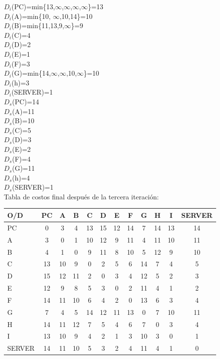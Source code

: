 \documentclass{article}
\begin{document}
{{{$D_i$(PC)=min\{13,$\infty$,$\infty$,$\infty$,$\infty$\}=13\\
$D_i$(A)=min\{10, $\infty$,10,14\}=10\\
$D_i$(B)=min\{11,13,9,$\infty$\}=9\\
$D_i$(C)=4\\
$D_i$(D)=2\\
$D_i$(E)=1\\
$D_i$(F)=3\\
$D_i$(G)=min\{14,$\infty$,$\infty$,10,$\infty$\}=10\\
$D_i$(h)=3\\
$D_i$(SERVER)=1\\

$D_s$(PC)=14\\
$D_s$(A)=11\\
$D_s$(B)=10\\
$D_s$(C)=5\\
$D_s$(D)=3\\
$D_s$(E)=2\\
$D_s$(F)=4\\
$D_s$(G)=11\\
$D_s$(h)=4\\
$D_s$(SERVER)=1\\

Tabla de costos final despu\'es de la tercera iteraci\'on:\\
\begin{tabular}{||l | c | c | c | c | c | c | c | c | c | c | c ||}
\hline
\hline
O/D & PC & A & B & C & D & E & F & G & H & I & SERVER \\
\hline
PC & 0 & 3 & 4 & 13 & 15 & 12 & 14 & 7 & 14 & 13 & 14 \\
\hline
A & 3 & 0 & 1 & 10 & 12 & 9 & 11 & 4 & 11 & 10 & 11 \\
\hline
B & 4 & 1 & 0 & 9 & 11 & 8 & 10 & 5 & 12 & 9 & 10 \\
\hline
C & 13 & 10 & 9 & 0 & 2 & 5 & 6 & 14 & 7 & 4 & 5 \\
\hline
D & 15 & 12 & 11 & 2 & 0 & 3 & 4 & 12 & 5 & 2 & 3 \\
\hline
E & 12 & 9 & 8 & 5 & 3 & 0 & 2 & 11 & 4 & 1 & 2 \\
\hline
F & 14 & 11 & 10 & 6 & 4 & 2 & 0 & 13 & 6 & 3 & 4 \\
\hline
G & 7 & 4 & 5 & 14 & 12 & 11 & 13 & 0 & 7 & 10 & 11 \\
\hline
H & 14 & 11 & 12 & 7 & 5 & 4 & 6 & 7 & 0 & 3 & 4 \\
\hline
I & 13 & 10 & 9 & 4 & 2 & 1 & 3 & 10 & 3 & 0 & 1 \\
\hline
SERVER & 14 & 11 & 10 & 5 & 3 & 2 & 4 & 11 & 4 & 1 & 0 \\
\hline
\end{tabular}\\\\

}}}
\end{document}

